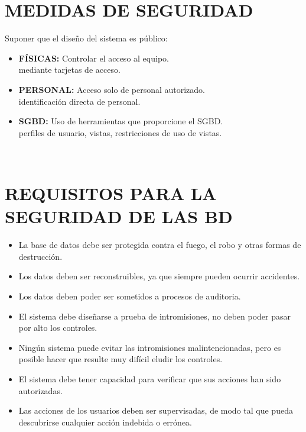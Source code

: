 \documentclass[conference]{IEEEtran}
\begin{document}
\section{MEDIDAS DE SEGURIDAD}

Suponer que el diseño del sistema es público:
\begin{itemize}
\item \textbf{FÍSICAS:} Controlar el acceso al equipo.
\\
mediante tarjetas de acceso.
\item \textbf{PERSONAL:} Acceso solo de personal autorizado.
\\
identificación directa de personal.
\item \textbf{SGBD:} Uso de herramientas que proporcione el SGBD.
\\
perfiles de usuario, vistas, restricciones de uso de vistas.
\\
\end{itemize}
\\

\section{REQUISITOS PARA LA SEGURIDAD DE LAS BD}
\begin{itemize}
\item \textbf{} La base de datos debe ser protegida contra el fuego, el robo y otras formas de destrucción.
\\
\item \textbf{} Los datos deben ser reconstruibles, ya que siempre pueden ocurrir accidentes.
\\
\item \textbf{} Los datos deben poder ser sometidos a procesos de auditoria.
\\
\item \textbf{} El sistema debe diseñarse a prueba de intromisiones, no deben poder pasar por alto los controles.
\\
\item \textbf{} Ningún sistema puede evitar las intromisiones malintencionadas, pero es posible hacer que resulte muy difícil eludir los controles.
\\
\item \textbf{} El sistema debe tener capacidad para verificar que sus acciones han sido autorizadas.
\\
\item \textbf{} Las acciones de los usuarios deben ser supervisadas, de modo tal que pueda descubrirse cualquier acción indebida o errónea.
\\
\end{itemize}
\end{document}
